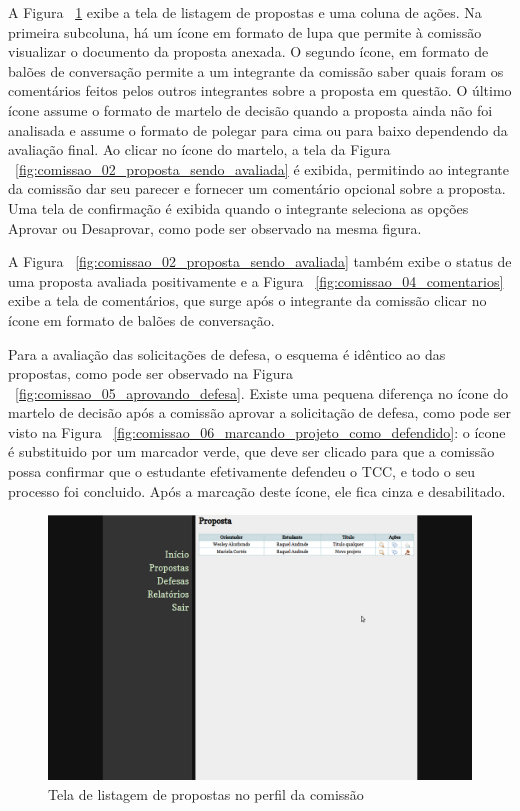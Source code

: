A Figura ~\ref{fig:comissao_01_propostas} exibe a tela de listagem de propostas e uma coluna de
ações. Na primeira subcoluna, há um ícone em formato de lupa que permite à comissão visualizar
o documento da proposta anexada. O segundo ícone, em formato de balões de conversação permite
a um integrante da comissão saber quais foram os comentários feitos pelos outros integrantes sobre
a proposta em questão. O último ícone assume o formato de martelo de decisão quando a proposta
ainda não foi analisada e assume o formato de polegar para cima ou para baixo dependendo da 
avaliação final. Ao clicar no ícone do martelo, a tela da Figura ~\ref{fig:comissao_02_proposta_sendo_avaliada}
é exibida, permitindo ao integrante da comissão dar seu parecer e fornecer um comentário opcional
sobre a proposta. Uma tela de confirmação é exibida quando o integrante seleciona as opções Aprovar
ou Desaprovar, como pode ser observado na mesma figura.

A Figura ~\ref{fig:comissao_02_proposta_sendo_avaliada} também exibe o status de uma
proposta avaliada positivamente e a Figura ~\ref{fig:comissao_04_comentarios} exibe a tela de comentários, que surge
após o integrante da comissão clicar no ícone em formato de balões de conversação. 

Para a avaliação das solicitações de defesa, o esquema é idêntico ao das propostas, como pode
ser observado na Figura ~\ref{fig:comissao_05_aprovando_defesa}. Existe uma pequena diferença
no ícone do martelo de decisão após a comissão aprovar a solicitação de defesa, como pode ser visto
na Figura ~\ref{fig:comissao_06_marcando_projeto_como_defendido}: o ícone é substituido por um
marcador verde, que deve ser clicado para que a comissão possa confirmar que o estudante
efetivamente defendeu o TCC, e todo o seu processo foi concluido. Após a marcação deste ícone,
ele fica cinza e desabilitado.

\begin{figure}[htbp]
\centering
\includegraphics[width=1\textwidth]{fig/telas/processo/comissao_01_propostas.png}
\caption{Tela de listagem de propostas no perfil da comissão}
\label{fig:comissao_01_propostas}
\end{figure}

